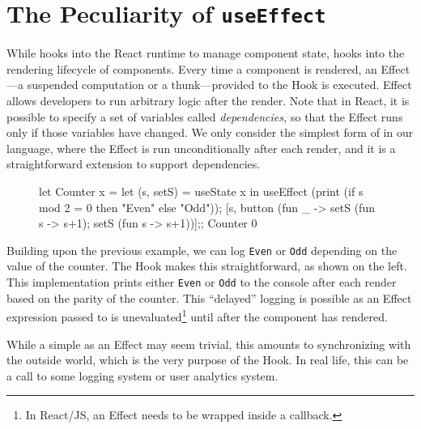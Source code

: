 \section{The Peculiarity of \textbf{\texttt{useEffect}}}\label{sec:useEffect}
While  hooks into the React runtime to manage component state,  hooks into the rendering lifecycle of components.
Every time a component is rendered, an Effect---a suspended computation or a thunk---provided to the  Hook is executed.
Effect allows developers to run arbitrary logic after the render.
Note that in React, it is possible to specify a set of variables called \emph{dependencies,} so that the Effect runs only if those variables have changed.
We only consider the simplest form of  in our language, where the Effect is run unconditionally after each render, and it is a straightforward extension to support dependencies.

\begin{figure}
  \vspace*{-1.3\intextsep}
  \begin{reactcode}
let Counter x =
  let (s, setS) = useState x in
  useEffect (print (if s mod 2 = 0
    then "Even" else "Odd"));
  [s, button (fun _ ->
    setS (fun s -> s+1);
    setS (fun s -> s+1))];;
Counter 0
  \end{reactcode}
\end{figure}
\noindent Building upon the previous  example, we can log \verb+Even+ or \verb+Odd+ depending on the value of the counter.
The  Hook makes this straightforward, as shown on the left.
This implementation prints either \verb+Even+ or \verb+Odd+ to the console after each render based on the parity of the counter.
This ``delayed'' logging is possible as an Effect expression passed to  is unevaluated\footnote{In React/JS, an Effect needs to be wrapped inside a callback.} until after the component has rendered.

While a simple  as an Effect may seem trivial, this amounts to synchronizing with the outside world, which is the very purpose of the  Hook.
In real life, this can be a call to some logging system or user analytics system.

